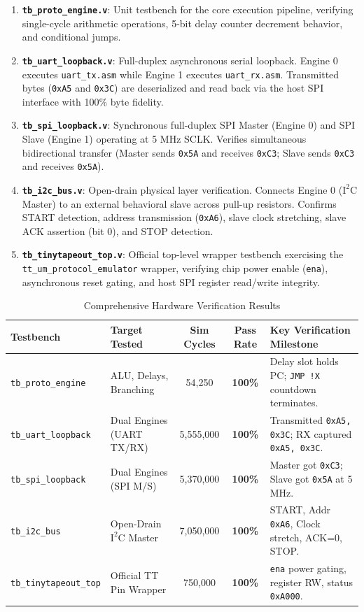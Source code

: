 \documentclass[11pt,a4paper]{article}
\begin{document}
\begin{enumerate}
    \item \textbf{\texttt{tb\_proto\_engine.v}}: Unit testbench for the core execution pipeline, verifying single-cycle arithmetic operations, 5-bit delay counter decrement behavior, and conditional jumps.
    \item \textbf{\texttt{tb\_uart\_loopback.v}}: Full-duplex asynchronous serial loopback. Engine 0 executes \texttt{uart\_tx.asm} while Engine 1 executes \texttt{uart\_rx.asm}. Transmitted bytes (\texttt{0xA5} and \texttt{0x3C}) are deserialized and read back via the host SPI interface with 100\% byte fidelity.
    \item \textbf{\texttt{tb\_spi\_loopback.v}}: Synchronous full-duplex SPI Master (Engine 0) and SPI Slave (Engine 1) operating at 5 MHz SCLK. Verifies simultaneous bidirectional transfer (Master sends \texttt{0x5A} and receives \texttt{0xC3}; Slave sends \texttt{0xC3} and receives \texttt{0x5A}).
    \item \textbf{\texttt{tb\_i2c\_bus.v}}: Open-drain physical layer verification. Connects Engine 0 ($\text{I}^2\text{C}$ Master) to an external behavioral slave across pull-up resistors. Confirms START detection, address transmission (\texttt{0xA6}), slave clock stretching, slave ACK assertion (bit 0), and STOP detection.
    \item \textbf{\texttt{tb\_tinytapeout\_top.v}}: Official top-level wrapper testbench exercising the \texttt{tt\_um\_protocol\_emulator} wrapper, verifying chip power enable (\texttt{ena}), asynchronous reset gating, and host SPI register read/write integrity.
\end{enumerate}

\begin{table}[htbp]
\centering
\caption{Comprehensive Hardware Verification Results}
\label{tab:verification_summary}
\begin{tabularx}{\textwidth}{llccX}
\toprule
\textbf{Testbench} & \textbf{Target Tested} & \textbf{Sim Cycles} & \textbf{Pass Rate} & \textbf{Key Verification Milestone} \\
\midrule
\texttt{tb\_proto\_engine} & ALU, Delays, Branching & 54,250 & \textbf{100\%} & Delay slot holds PC; \texttt{JMP !X} countdown terminates. \\
\texttt{tb\_uart\_loopback} & Dual Engines (UART TX/RX) & 5,555,000 & \textbf{100\%} & Transmitted \texttt{0xA5, 0x3C}; RX captured \texttt{0xA5, 0x3C}. \\
\texttt{tb\_spi\_loopback}  & Dual Engines (SPI M/S)   & 5,370,000 & \textbf{100\%} & Master got \texttt{0xC3}; Slave got \texttt{0x5A} at 5 MHz. \\
\texttt{tb\_i2c\_bus}       & Open-Drain $\text{I}^2\text{C}$ Master & 7,050,000 & \textbf{100\%} & START, Addr \texttt{0xA6}, Clock stretch, ACK=0, STOP. \\
\texttt{tb\_tinytapeout\_top} & Official TT Pin Wrapper & 750,000 & \textbf{100\%} & \texttt{ena} power gating, register RW, status \texttt{0xA000}. \\
\bottomrule
\end{tabularx}
\end{table}
\end{document}
